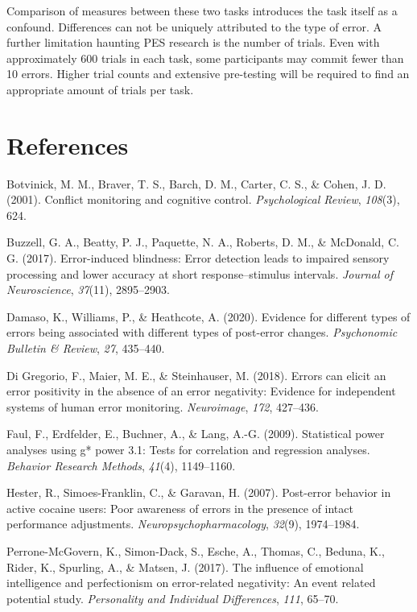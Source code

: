\documentclass[
  man,floatsintext]{apa7}
\newlength{\cslhangindent}
\newlength{\cslentryspacingunit} %
\newenvironment{CSLReferences}[2] %
 {%
  \setlength{\parindent}{0pt}
  \ifodd #1
  \let\oldpar\par
  \def\par{\hangindent=\cslhangindent\oldpar}
  \fi
  \setlength{\parskip}{#2\cslentryspacingunit}
 }%
 {}
\begin{document}
Comparison of measures between these two tasks introduces the task itself as a confound. Differences can not be uniquely attributed to the type of error. A further limitation haunting PES research is the number of trials. Even with approximately 600 trials in each task, some participants may commit fewer than 10 errors. Higher trial counts and extensive pre-testing will be required to find an appropriate amount of trials per task.

\newpage

\hypertarget{references}{%
\section{References}\label{references}}

\hypertarget{refs}{}
\begin{CSLReferences}{1}{0}
\leavevmode{}%
Botvinick, M. M., Braver, T. S., Barch, D. M., Carter, C. S., \& Cohen, J. D. (2001). Conflict monitoring and cognitive control. \emph{Psychological Review}, \emph{108}(3), 624.

\leavevmode{}%
Buzzell, G. A., Beatty, P. J., Paquette, N. A., Roberts, D. M., \& McDonald, C. G. (2017). Error-induced blindness: Error detection leads to impaired sensory processing and lower accuracy at short response--stimulus intervals. \emph{Journal of Neuroscience}, \emph{37}(11), 2895--2903.

\leavevmode{}%
Damaso, K., Williams, P., \& Heathcote, A. (2020). Evidence for different types of errors being associated with different types of post-error changes. \emph{Psychonomic Bulletin \& Review}, \emph{27}, 435--440.

\leavevmode{}%
Di Gregorio, F., Maier, M. E., \& Steinhauser, M. (2018). Errors can elicit an error positivity in the absence of an error negativity: Evidence for independent systems of human error monitoring. \emph{Neuroimage}, \emph{172}, 427--436.

\leavevmode{}%
Faul, F., Erdfelder, E., Buchner, A., \& Lang, A.-G. (2009). Statistical power analyses using g* power 3.1: Tests for correlation and regression analyses. \emph{Behavior Research Methods}, \emph{41}(4), 1149--1160.

\leavevmode{}%
Hester, R., Simoes-Franklin, C., \& Garavan, H. (2007). Post-error behavior in active cocaine users: Poor awareness of errors in the presence of intact performance adjustments. \emph{Neuropsychopharmacology}, \emph{32}(9), 1974--1984.

\leavevmode{}%
Perrone-McGovern, K., Simon-Dack, S., Esche, A., Thomas, C., Beduna, K., Rider, K., Spurling, A., \& Matsen, J. (2017). The influence of emotional intelligence and perfectionism on error-related negativity: An event related potential study. \emph{Personality and Individual Differences}, \emph{111}, 65--70.

\end{CSLReferences}
\end{document}
